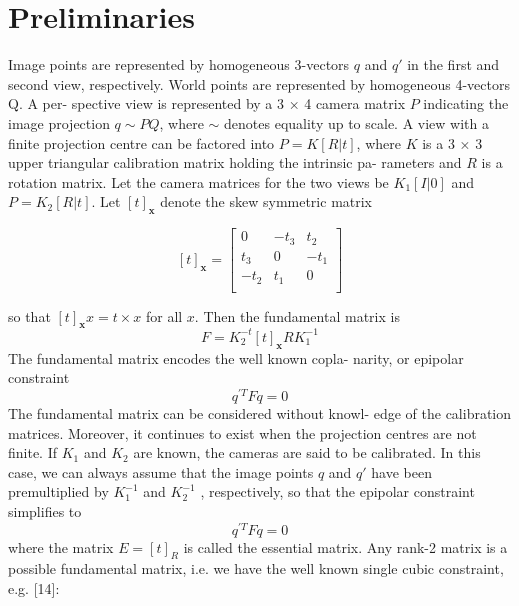 \documentclass[10pt,twocolumn,letterpaper]{article}
\begin{document}
\section {\label{sec:Preliminaries}Preliminaries}
Image points are represented by homogeneous 3-vectors $q$
and $q'$ in the first and second view, respectively. World
points are represented by homogeneous 4-vectors Q. A per-
spective view is represented by a 3 × 4 camera matrix $P$
indicating the image projection $q\sim PQ$, where $\sim $ denotes
equality up to scale. A view with a finite projection centre
can be factored into $P = K \left[R |t\right]$, where $K$ is a 3 × 3
upper triangular calibration matrix holding the intrinsic pa-
rameters and $R$ is a rotation matrix. Let the camera matrices
for the two views be $K_1 \left[I | 0\right]$ and $P = K_2 \left[R | t\right]$. Let $[t]_\mathbf{x}$
denote the skew symmetric matrix


\begin{equation}
    \left[t\right]_\mathbf{x} =
     \left[
    \begin{array}{ccc}
    0 & -t_3 & t_2 \\
    t_3 & 0 & -t_1 \\
    -t_2 & t_1 & 0 \\
    \end{array}
    \right]
    \label{eq:eq1}
\end{equation}

{\small


}

so that $\left[t\right]_\mathbf{x}x = t\times x$ for all $x$. Then the fundamental matrix
is
\begin{equation}
   F=K_2^{-t} \left[t\right] _\mathbf{x}RK_1^{-1}
    \label{eq:eq2}
\end{equation}
The fundamental matrix encodes the well known copla-
narity, or epipolar constraint
\begin{equation}
    q^{'T}Fq=0
    \label{eq:eq3}
\end{equation}
The fundamental matrix can be considered without knowl-
edge of the calibration matrices. Moreover, it continues to
exist when the projection centres are not finite. If $K_1$ and
$K_2$ are known, the cameras are said to be calibrated. In this
case, we can always assume that the image points $q$ and $q'$
have been premultiplied by $K_1^{-1}$ and $K_2^{-1}$
, respectively, so
that the epipolar constraint simplifies to
\begin{equation}
    q^{'T}Fq=0
    \label{eq:eq4}
\end{equation}
where the matrix $E=\left[t\right]_R$ is called the essential matrix.
Any rank-2 matrix is a possible fundamental matrix, i.e. we
have the well known single cubic constraint, e.g. [14]:
\end{document}
